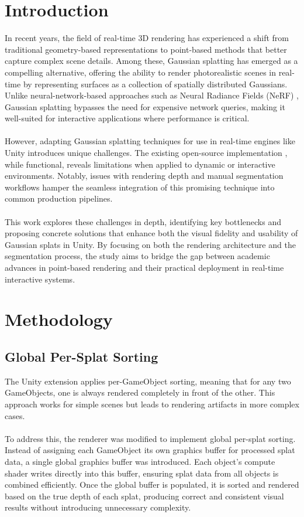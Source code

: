 \documentclass[twocolumn]{article}
\begin{document}
	\section{Introduction}
In recent years, the field of real-time 3D rendering has experienced a shift from traditional geometry-based representations to point-based methods that better capture complex scene details. Among these, Gaussian splatting \cite{OriginalSplatting} has emerged as a compelling alternative, offering the ability to render photorealistic scenes in real-time by representing surfaces as a collection of spatially distributed Gaussians. Unlike neural-network-based approaches such as Neural Radiance Fields (NeRF) \cite{Nerf}, Gaussian splatting bypasses the need for expensive network queries, making it well-suited for interactive applications where performance is critical.
\\\\
However, adapting Gaussian splatting techniques for use in real-time engines like Unity introduces unique challenges. The existing open-source implementation \cite{Aras}, while functional, reveals limitations when applied to dynamic or interactive environments. Notably, issues with rendering depth and manual segmentation workflows hamper the seamless integration of this promising technique into common production pipelines.
\\\\
This work explores these challenges in depth, identifying key bottlenecks and proposing concrete solutions that enhance both the visual fidelity and usability of Gaussian splats in Unity. By focusing on both the rendering architecture and the segmentation process, the study aims to bridge the gap between academic advances in point-based rendering and their practical deployment in real-time interactive systems.

	\section{Methodology}
	\subsection{Global Per-Splat Sorting}
The Unity extension applies per-GameObject sorting, meaning that for any two GameObjects, one is always rendered completely in front of the other. This approach works for simple scenes but leads to rendering artifacts in more complex cases.
\\\\
To address this, the renderer was modified to implement global per-splat sorting. Instead of assigning each GameObject its own graphics buffer for processed splat data, a single global graphics buffer was introduced. Each object's compute shader writes directly into this buffer, ensuring splat data from all objects is combined efficiently. Once the global buffer is populated, it is sorted and rendered based on the true depth of each splat, producing correct and consistent visual results without introducing unnecessary complexity.
\end{document}
